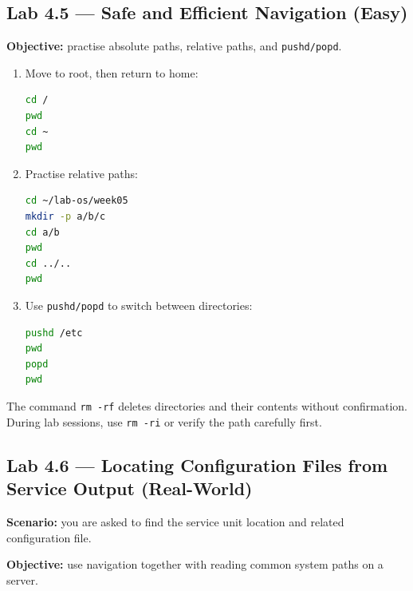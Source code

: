 \subsection*{Lab 4.5 --- Safe and Efficient Navigation (Easy)}
\textbf{Objective:} practise absolute paths, relative paths, and \texttt{pushd/popd}.

\begin{enumerate}
    \item Move to root, then return to home:
\begin{lstlisting}[language=bash, caption={Absolute path vs returning to home}]
cd /
pwd
cd ~
pwd
\end{lstlisting}

    \item Practise relative paths:
\begin{lstlisting}[language=bash, caption={Relative paths in the workspace}]
cd ~/lab-os/week05
mkdir -p a/b/c
cd a/b
pwd
cd ../..
pwd
\end{lstlisting}

    \item Use \texttt{pushd/popd} to switch between directories:
\begin{lstlisting}[language=bash, caption={Directory stack navigation}]
pushd /etc
pwd
popd
pwd
\end{lstlisting}
\end{enumerate}

\begin{warningbox}
The command \texttt{rm -rf} deletes directories and their contents without
confirmation. During lab sessions, use \texttt{rm -ri} or verify the path
carefully first.
\end{warningbox}

\subsection*{Lab 4.6 --- Locating Configuration Files from Service Output (Real-World)}
\textbf{Scenario:} you are asked to find the service unit location and related
configuration file.

\textbf{Objective:} use navigation together with reading common system paths on
a server.

